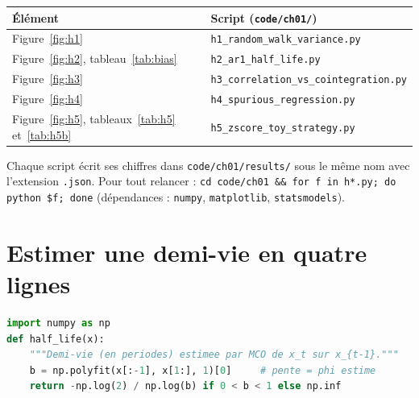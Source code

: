 \documentclass[11pt,a4paper]{article}
\begin{document}
\begin{center}\small
\begin{tabular}{ll}
\toprule
Élément & Script (\texttt{code/ch01/}) \\
\midrule
Figure~\ref{fig:h1} & \texttt{h1\_random\_walk\_variance.py} \\
Figure~\ref{fig:h2}, tableau~\ref{tab:bias} & \texttt{h2\_ar1\_half\_life.py} \\
Figure~\ref{fig:h3} & \texttt{h3\_correlation\_vs\_cointegration.py} \\
Figure~\ref{fig:h4} & \texttt{h4\_spurious\_regression.py} \\
Figure~\ref{fig:h5}, tableaux~\ref{tab:h5} et~\ref{tab:h5b} & \texttt{h5\_zscore\_toy\_strategy.py} \\
\bottomrule
\end{tabular}
\end{center}

\noindent Chaque script écrit ses chiffres dans \texttt{code/ch01/results/} sous le même nom avec l'extension \texttt{.json}. Pour tout relancer : \texttt{cd code/ch01 \&\& for f in h*.py; do python \$f; done} (dépendances : \texttt{numpy}, \texttt{matplotlib}, \texttt{statsmodels}).

\section{Estimer une demi-vie en quatre lignes}

\begin{lstlisting}[language=Python]
import numpy as np
def half_life(x):
    """Demi-vie (en periodes) estimee par MCO de x_t sur x_{t-1}."""
    b = np.polyfit(x[:-1], x[1:], 1)[0]     # pente = phi estime
    return -np.log(2) / np.log(b) if 0 < b < 1 else np.inf
\end{lstlisting}



\end{document}
